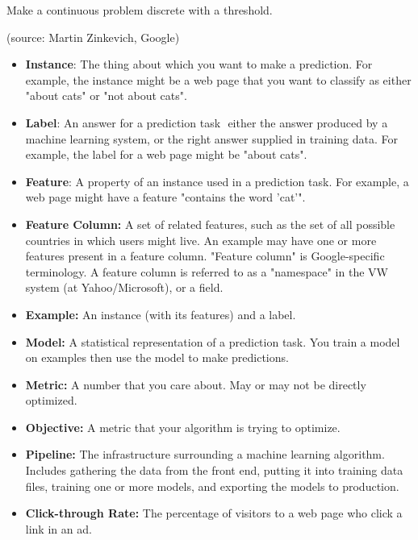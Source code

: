 
Make a continuous problem discrete with a threshold.



(source: Martin Zinkevich, Google)


\begin{itemize}
\item \textbf{Instance}: The thing about which you want to make a
  prediction. For example, the instance might be a web page that you
  want to classify as either "about cats" or "not about cats".
\item \textbf{Label}: An answer for a prediction task ­­ either the
  answer produced by a machine learning system, or the right answer
  supplied in training data. For example, the label for a web page
  might be "about cats".
\item \textbf{Feature}: A property of an instance used in a prediction
  task. For example, a web page might have a feature "contains the
  word 'cat'".
\item \textbf{Feature Column:} A set of related features, such as the
  set of all possible countries in which users might live. An example
  may have one or more features present in a feature column. "Feature
  column" is Google-specific terminology. A feature column is referred
  to as a "namespace" in the VW system (at Yahoo/Microsoft), or a
  field.
\item \textbf{Example:} An instance (with its features) and a label.
\item \textbf{Model:} A statistical representation of a prediction
  task. You train a model on examples then use the model to make
  predictions.
\item \textbf{Metric:} A number that you care about. May or may not be
  directly optimized.
\item \textbf{Objective:} A metric that your algorithm is trying to optimize.
\item \textbf{Pipeline:} The infrastructure surrounding a machine
  learning algorithm. Includes gathering the data from the front end,
  putting it into training data files, training one or more models,
  and exporting the models to production.
\item \textbf{Click-through Rate:} The percentage of visitors to a web
    page who click a link in an ad.
\end{itemize}


